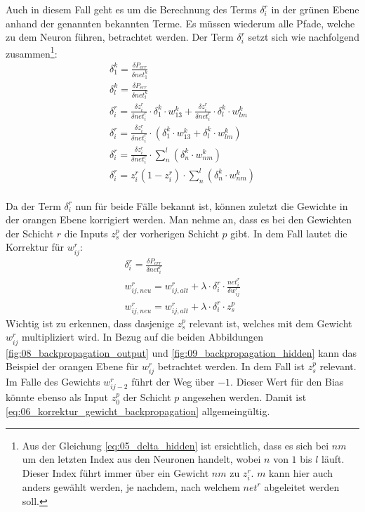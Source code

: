 Auch in diesem Fall geht es um die Berechnung des Terms $\delta_i^r$ in der grünen Ebene anhand der genannten bekannten Terme. Es müssen wiederum
alle Pfade, welche zu dem Neuron führen, betrachtet werden. Der Term $\delta_i^r$ setzt sich wie nachfolgend zusammen\footnote{Aus der Gleichung \ref{eq:05_delta_hidden}
ist ersichtlich, dass es sich bei $nm$ um den letzten Index aus den Neuronen handelt, wobei $n$
von $1$ bis $l$ läuft. Dieser Index führt immer über ein Gewicht $nm$ zu $z_i^r$. $m$ kann hier auch anders gewählt werden,
je nachdem, nach welchem $net^r$ abgeleitet werden soll.}:
\begin{align}
    \delta_1^k = \frac{\delta P_{err}}{\delta net_1^k}\\
    \delta_l^k = \frac{\delta P_{err}}{\delta net_l^k}\\
    \delta_i^r = \frac{\delta z_i^r}{\delta net_i^r} \cdot \delta_1^k \cdot w_{13}^k + \frac{\delta z_i^r}{\delta net_i^r} \cdot \delta_l^k \cdot w_{lm}^k\\
    \delta_i^r = \frac{\delta z_i^r}{\delta net_i^r} \cdot (\delta_1^k \cdot w_{13}^k + \delta_l^k \cdot w_{lm}^k)\\
    \delta_i^r = \frac{\delta z_i^r}{\delta net_i^r} \cdot \sum_n^l(\delta_n^k \cdot w_{nm}^k)\\
    \delta_i^r = z_i^r(1 - z_i^r) \cdot \sum_n^l(\delta_n^k \cdot w_{nm}^k)\label{eq:05_delta_hidden}
\end{align}
\\

Da der Term $\delta_i^r$ nun für beide Fälle bekannt ist, können zuletzt die Gewichte in der orangen Ebene korrigiert werden.
Man nehme an, dass es bei den Gewichten der Schicht $r$ die Inputs $z_{s}^{p}$ der vorherigen Schicht $p$ gibt.
In dem Fall lautet die Korrektur für $w_{ij}^r$:
\begin{align}
    \delta_i^r = \frac{\delta P_{err}}{\delta net_i^r}\\
    w_{ij, neu}^r = w_{ij, alt}^r + \lambda \cdot \delta_i^r \cdot \frac{net_i^r}{\delta w_{ij}^r}\\
    w_{ij, neu}^r = w_{ij, alt}^r + \lambda \cdot \delta_i^r \cdot z_{s}^{p}\label{eq:06_korrektur_gewicht_backpropagation}
\end{align}
Wichtig ist zu erkennen, dass dasjenige $z_s^p$ relevant ist, welches mit dem Gewicht $w_{ij}^r$ multipliziert wird.
In Bezug auf die beiden Abbildungen \ref{fig:08_backpropagation_output} und \ref{fig:09_backpropagation_hidden}
kann das Beispiel der orangen Ebene für $w_{ij}^r$ betrachtet werden. In dem Fall ist $z_s^p$ relevant. Im Falle des Gewichts
$w_{ij-2}^r$ führt der Weg über $-1$. Dieser Wert für den Bias könnte ebenso als Input $z_0^p$ der Schicht $p$ angesehen werden.
Damit ist \ref{eq:06_korrektur_gewicht_backpropagation} allgemeingültig.
\\

